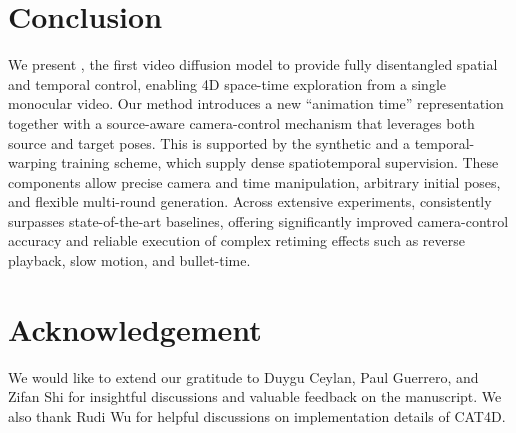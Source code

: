 \section{Conclusion}
We present \nameMethod, the first video diffusion model to provide fully disentangled spatial and temporal control, enabling 4D space-time exploration from a single monocular video.
Our method introduces a new “animation time” representation together with a source-aware camera-control mechanism that leverages both source and target poses. This is supported by the synthetic \nameDataset and a temporal-warping training scheme, which supply dense spatiotemporal supervision.
These components allow precise camera and time manipulation, arbitrary initial poses, and flexible multi-round generation.
Across extensive experiments, \nameMethod consistently surpasses state-of-the-art baselines, offering significantly improved camera-control accuracy and reliable execution of complex retiming effects such as reverse playback, slow motion, and bullet-time. 

\section{Acknowledgement}

We would like to extend our gratitude to Duygu Ceylan, Paul Guerrero, and Zifan Shi for insightful discussions and valuable feedback on the manuscript. We also thank Rudi Wu for helpful discussions on implementation details of CAT4D.
